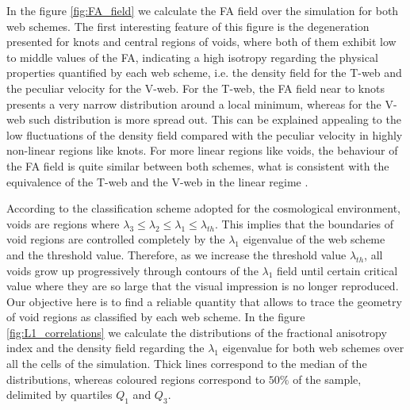 \documentclass[a4,useAMS,usenatbib,usegraphicx]{latex/mn2e}
\begin{document}
In the figure \ref{fig:FA_field} we calculate the FA field over the 
simulation for both web schemes. The first interesting feature of this
figure is the degeneration presented for knots and central regions of 
voids, where both of them exhibit low to middle values of the FA, 
indicating a high isotropy regarding the physical properties quantified by 
each web scheme, i.e. the density field for the T-web and the peculiar 
velocity for the V-web. For the T-web, the FA field near to knots presents 
a very narrow distribution around a local minimum, whereas for the V-web 
such distribution is more spread out. This can be explained appealing to 
the low fluctuations of the density field compared with the peculiar 
velocity in highly non-linear regions like knots. For more linear regions 
like voids, the behaviour of the FA field is quite similar between both 
schemes, what is consistent with the equivalence of the T-web and the 
V-web in the linear regime .


According to the classification scheme adopted for the cosmological 
environment, voids are regions where 
$\lambda_3\leq\lambda_2\leq\lambda_1\leq\lambda_{th}$. This implies that
the boundaries of void regions are controlled completely by the $\lambda_1$
eigenvalue of the web scheme and the threshold value. Therefore, as we 
increase the threshold value $\lambda_{th}$, all voids grow up 
progressively through contours of the $\lambda_1$ field until certain 
critical value where they are so large that the visual impression is no 
longer reproduced. Our objective here is to find a reliable quantity that 
allows to trace the geometry of void regions as classified by each web 
scheme. In the figure \ref{fig:L1_correlations} we calculate the 
distributions of the fractional anisotropy index and the density field 
regarding the $\lambda_1$ eigenvalue for both web schemes over all the 
cells of the simulation. Thick lines correspond to the median of the 
distributions, whereas coloured regions correspond to $50\%$ of the
sample, delimited by quartiles $Q_1$ and $Q_3$. 
\end{document}
